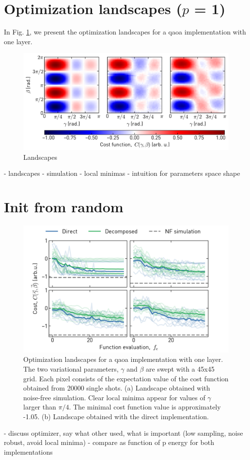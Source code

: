 \section{Optimization landscapes ($p$ = 1)}
In Fig. \ref{fig:qaoa_landscapes}, we present the optimization landscapes for a \gls{qaoa} implementation with one layer. 
\begin{figure}[ht]
    \centering
    \includegraphics[width=\textwidth]{chapters/qaoa/figs/qaoa_landscapes_20200129_125251.png}
    \caption{Landscapes}
    \label{fig:qaoa_landscapes}
\end{figure}
- landscapes
- simulation
- local minimas
- intuition for parameters space shape

\section{Init from random}
\begin{figure}[ht]
    \centering
    \includegraphics[width=\textwidth]{chapters/qaoa/figs/ch5_qaoa_optimization_traces_20200116_165916.png}
    \caption{Optimization landscapes for a \gls{qaoa} implementation with one layer. The two variational parameters, $\gamma$ and $\beta$ are swept with a 45x45 grid. Each pixel consists of the expectation value of the cost function obtained from 20000 single shots. (a) Landscape obtained with noise-free simulation. Clear local minima appear for values of $\gamma$ larger than $\pi/4$. The minimal cost function value is approximately -1.05. (b) Landscape obtained with the direct implementation. }
    \label{fig:qaoa_optimization_traces}
\end{figure}
- discuss optimizer, say what other used, what is important (low sampling, noise robust, avoid local minima)
- compare as function of p energy for both implementations


